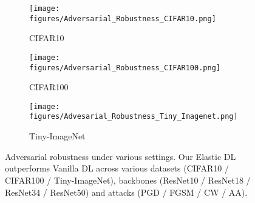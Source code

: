 \begin{figure*}[htbp]
    \centering
    \begin{subfigure}[b]{0.33\textwidth} %
        \centering
        \texttt{[image: figures/Adversarial\_Robustness\_CIFAR10.png]} %
        \caption{CIFAR10} %
        \label{fig:subfig_a}
    \end{subfigure}
    \hfill
    \begin{subfigure}[b]{0.33\textwidth}
        \centering
        \texttt{[image: figures/Adversarial\_Robustness\_CIFAR100.png]} %
        \caption{CIFAR100}
        \label{fig:subfig_b}
    \end{subfigure}
    \hfill
    \begin{subfigure}[b]{0.33\textwidth}
        \centering
        \texttt{[image: figures/Advesarial\_Robustness\_Tiny\_Imagenet.png]} %
        \caption{Tiny-ImageNet}
        \label{fig:subfig_d}
    \end{subfigure}
    \vspace{-0.3in}
    \caption{Adversarial robustness under various settings. Our Elastic DL outperforms Vanilla DL across various  datasets (CIFAR10 / CIFAR100 / Tiny-ImageNet), backbones (ResNet10 / ResNet18 / ResNet34 / ResNet50) and attacks (PGD / FGSM / CW / AA).
    } %
    \label{fig:diff_datasets}
    \vspace{-0.2in}
\end{figure*}


